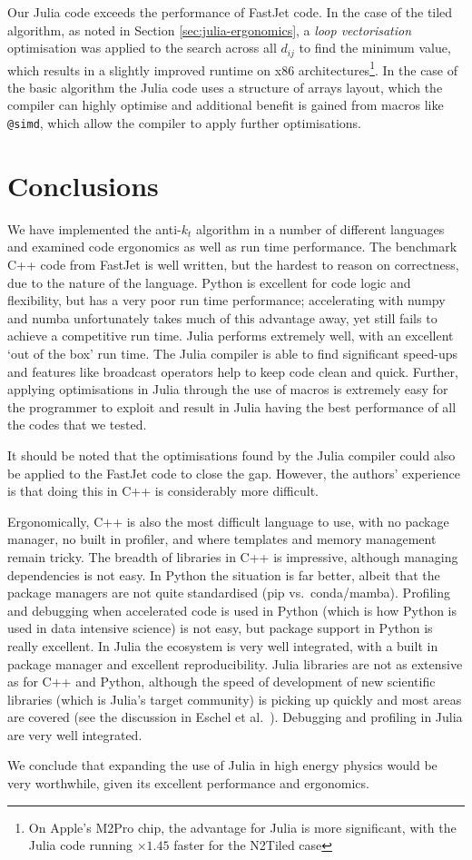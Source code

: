\documentclass{webofc}
\begin{document}
Our Julia code exceeds the performance of FastJet code. In the case of the tiled
algorithm, as noted in Section \ref{sec:julia-ergonomics}, a \emph{loop
vectorisation} optimisation was applied to the search across all $d_{ij}$ to
find the minimum value, which results in a slightly improved runtime on x86
architectures\footnote{On Apple's M2Pro chip, the advantage for Julia is more
significant, with the Julia code running $\times1.45$ faster for the N2Tiled
case}. In the case of the basic algorithm the Julia code uses a structure of
arrays layout, which the compiler can highly optimise and additional benefit is
gained from macros like \texttt{@simd}, which allow the compiler to apply
further optimisations.

\section{Conclusions}
\label{sec:conclusions}

We have implemented the anti-$k_t$ algorithm in a number of different languages
and examined code ergonomics as well as run time performance. The benchmark C++
code from FastJet is well written, but the hardest to reason on correctness, due
to the nature of the language. Python is excellent for code logic and
flexibility, but has a very poor run time performance; accelerating with numpy
and numba unfortunately takes much of this advantage away, yet still fails to
achieve a competitive run time. Julia performs extremely well, with an excellent
`out of the box' run time. The Julia compiler is able to find significant
speed-ups and features like broadcast operators help to keep code clean and
quick. Further, applying optimisations in Julia through the use of macros is
extremely easy for the programmer to exploit and result in Julia having the best
performance of all the codes that we tested.

It should be noted that the optimisations found by the Julia compiler could also
be applied to the FastJet code to close the gap. However, the authors'
experience is that doing this in C++ is considerably more difficult.

Ergonomically, C++ is also the most difficult language to use, with no package
manager, no built in profiler, and where templates and memory management remain
tricky. The breadth of libraries in C++ is impressive, although managing
dependencies is not easy. In Python the situation is far better, albeit that the
package managers are not quite standardised (pip vs.\ conda/mamba). Profiling
and debugging when accelerated code is used in Python (which is how Python is
used in data intensive science) is not easy, but package support in Python is
really excellent. In Julia the ecosystem is very well integrated, with a built
in package manager and excellent reproducibility. Julia libraries are not as
extensive as for C++ and Python, although the speed of development of new
scientific libraries (which is Julia's target community) is picking up quickly
and most areas are covered (see the discussion in Eschel et
al.~\cite{eschle2023potential}). Debugging and profiling in Julia are very well
integrated.

We conclude that expanding the use of Julia in high energy
physics would be very worthwhile, given its excellent performance and ergonomics.

\sloppy
\raggedright

\end{document}

